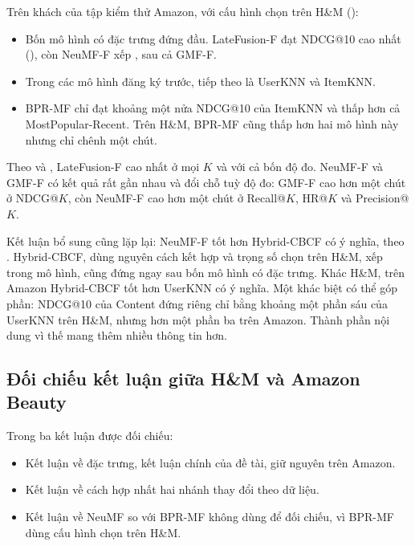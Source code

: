 Trên  khách của tập kiểm thử Amazon, với cấu hình chọn trên H\&M ():
\begin{itemize}
    \item Bốn mô hình có đặc trưng đứng đầu. LateFusion-F đạt NDCG@10 cao nhất (), còn NeuMF-F xếp , sau cả GMF-F.
    \item Trong các mô hình đăng ký trước, tiếp theo là UserKNN và ItemKNN.
    \item BPR-MF chỉ đạt khoảng một nửa NDCG@10 của ItemKNN và thấp hơn cả MostPopular-Recent. Trên H\&M, BPR-MF cũng thấp hơn hai mô hình này nhưng chỉ chênh một chút.
\end{itemize}


Theo  và , LateFusion-F cao nhất ở mọi $K$ và với cả bốn độ đo. NeuMF-F và GMF-F có kết quả rất gần nhau và đổi chỗ tuỳ độ đo: GMF-F cao hơn một chút ở NDCG@$K$, còn NeuMF-F cao hơn một chút ở Recall@$K$, HR@$K$ và Precision@$K$.



Kết luận bổ sung cũng lặp lại: NeuMF-F tốt hơn Hybrid-CBCF có ý nghĩa, theo . Hybrid-CBCF, dùng nguyên cách kết hợp và trọng số chọn trên H\&M, xếp  trong  mô hình, cũng đứng ngay sau bốn mô hình có đặc trưng. Khác H\&M, trên Amazon Hybrid-CBCF tốt hơn UserKNN có ý nghĩa. Một khác biệt có thể góp phần: NDCG@10 của Content đứng riêng chỉ bằng khoảng một phần sáu của UserKNN trên H\&M, nhưng hơn một phần ba trên Amazon. Thành phần nội dung vì thế mang thêm nhiều thông tin hơn.


\subsection{Đối chiếu kết luận giữa H\texorpdfstring{\&}{\&}M và Amazon Beauty}
\label{subsec:amazon_compare}

Trong ba kết luận được đối chiếu:
\begin{itemize}
    \item Kết luận về đặc trưng, kết luận chính của đề tài, giữ nguyên trên Amazon.
    \item Kết luận về cách hợp nhất hai nhánh thay đổi theo dữ liệu.
    \item Kết luận về NeuMF so với BPR-MF không dùng để đối chiếu, vì BPR-MF dùng cấu hình chọn trên H\&M.
\end{itemize}

